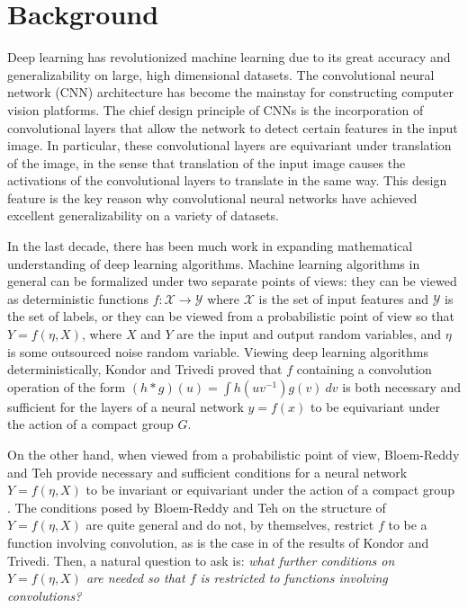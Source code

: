 

\section{Background}
Deep learning has revolutionized machine learning due to its great accuracy and generalizability on large, high dimensional datasets. 
The convolutional neural network (CNN) architecture has become the mainstay for constructing computer vision platforms. 
The chief design principle of CNNs is the incorporation of convolutional layers that allow the network to detect certain features in the input
image. 
In particular, these convolutional layers are equivariant under translation of the image, in the sense that translation of the input image causes the activations of the convolutional layers to translate in the same way. 
This design feature is the key reason why convolutional neural networks have achieved excellent generalizability on a variety of datasets.

In the last decade, there has been much work in expanding mathematical understanding of deep learning algorithms. 
Machine learning algorithms in general can be formalized under two separate points of views: they can be viewed as deterministic functions $f : \mathcal{X} \to \mathcal{Y}$ where $\mathcal{X}$ is the set of input features and $\mathcal{Y}$ is the set of labels, or they can be viewed from a probabilistic point of view so that $Y = f(\eta,X)$, where $X$ and $Y$ are the input and output random variables, and $\eta$ is some outsourced noise random variable.
Viewing deep learning algorithms deterministically, Kondor and Trivedi proved that $f$ containing a convolution operation of the form $(h * g)(u) = \int h(uv^{-1})g(v)\ dv$ is both necessary and sufficient for the layers of a neural network
$y = f(x)$ to be equivariant under the action of a compact group $G$\cite{kondor2018generalization}. 

On the other hand, when viewed from a probabilistic point of view, Bloem-Reddy and Teh provide necessary and sufficient conditions for a neural network $Y = f(\eta,X)$ to be invariant or equivariant under the action of a compact group \cite{bloemreddy2019probabilistic}.
The conditions posed by Bloem-Reddy and Teh on the structure of $Y = f(\eta, X)$ are quite general and do not, by themselves, restrict $f$ to be a function involving convolution, as is the case in of the results of Kondor and Trivedi. 
Then, a natural question to ask is: \textit{what further conditions on $Y = f(\eta, X)$ are needed so that $f$ is restricted to functions involving convolutions?}

